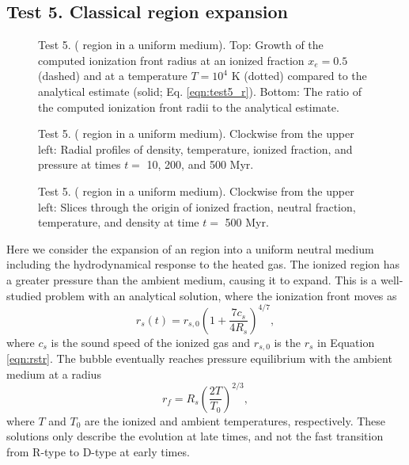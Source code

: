 \documentclass[apj,onecolumn]{emulateapj}
\begin{document}
\subsection{Test 5. Classical  region expansion}
\label{sec:test5}

\begin{figure}[t]
  \caption{\label{fig:test5_1} Test 5. ( region in a uniform
    medium).  Top: Growth of the computed ionization front radius at
    an ionized fraction $x_e = 0.5$ (dashed) and at a temperature $T =
    10^4$ K (dotted) compared to the analytical estimate (solid;
    Eq. \ref{eqn:test5_r}).  Bottom: The ratio of the computed
    ionization front radii to the analytical estimate.} 
\end{figure}

\begin{figure}[t]
  \caption{\label{fig:test5_2} Test 5. ( region in a uniform
    medium).  Clockwise from the upper left: Radial profiles of
    density, temperature, ionized fraction, and pressure at times $t
    =$ 10, 200, and 500 Myr.}
\end{figure}

\begin{figure}[t]
  \caption{\label{fig:test5_3} Test 5. ( region in a uniform
    medium).  Clockwise from the upper left: Slices through the origin
    of ionized fraction, neutral fraction, temperature, and density at
    time $t =$ 500 Myr.}
\end{figure}

Here we consider the expansion of an  region into a uniform
neutral medium including the hydrodynamical response to the heated
gas.  The ionized region has a greater pressure than the ambient
medium, causing it to expand.  This is a well-studied problem
\citep{Spitzer78} with an analytical solution, where the ionization
front moves as
%
\begin{equation}
  \label{eqn:test5_r}
  r_s(t) = r_{s,0} \left(1 + \frac{7c_s}{4R_s}\right)^{4/7},
\end{equation}
where $c_s$ is the sound speed of the ionized gas and $r_{s,0}$ is the
$r_s$ in Equation \ref{eqn:rstr}.  The bubble eventually reaches
pressure equilibrium with the ambient medium at a radius
%
\begin{equation}
  \label{eqn:test5_final}
  r_f = R_s \left(\frac{2T}{T_0}\right)^{2/3},
\end{equation}
where $T$ and $T_0$ are the ionized and ambient temperatures,
respectively.  These solutions only describe the evolution at late
times, and not the fast transition from R-type to D-type at early
times.
\end{document}
